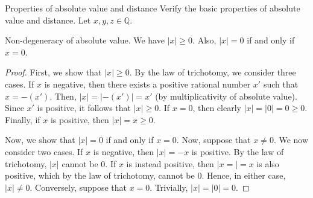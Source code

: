 \begin{problem}{Properties of absolute value and distance}
	Verify the basic properties of absolute value and distance. Let $x, y, z \in \mathbb{Q}.$
\end{problem}
\begin{proposition}
    Non-degeneracy of absolute value. We have $\lvert x \rvert \geq 0.$ 
    Also, $\lvert x \rvert = 0$ if and only if $x = 0.$
\end{proposition}
\begin{proof}
    First, we show that $\lvert x \rvert \geq 0.$ 
    By the law of trichotomy, we consider three cases. 
    If $x$ is negative, then there exists a positive rational number $x'$ such that $x = -(x').$
    Then, $\lvert x \rvert = \lvert -(x') \rvert = x'$ (by multiplicativity of absolute value).
    Since $x'$ is positive, it follows that $\lvert x \rvert \geq 0.$
    If $x = 0$, then clearly $\lvert x \rvert = \lvert 0 \rvert = 0 \geq 0.$
    Finally, if $x$ is positive, then $\lvert x \rvert = x \geq 0.$

    Now, we show that $\lvert x \rvert = 0$ if and only if $x = 0.$
    Now, suppose that $x \neq 0.$ We now consider two cases.
    If $x$ is negative, then $\lvert x \rvert = -x$ is positive. 
    By the law of trichotomy, $\lvert x \rvert$ cannot be 0.
    If $x$ is instead positive, then $\lvert x = \rvert = x$ is also positive, which by the law of trichotomy, cannot be 0.
    Hence, in either case, $\lvert x \rvert \neq 0.$
    Conversely, suppose that $x = 0.$ Trivially, $\lvert x \rvert = \lvert 0 \rvert = 0.$
\end{proof}

